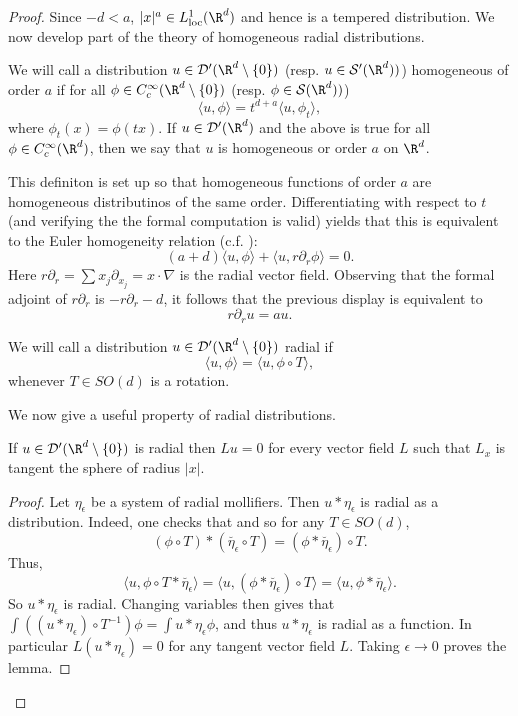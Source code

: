\documentclass[12pt]{article}
\begin{document}
\begin{proof}
Since $-d < a$, $|x|^a \in L^1_{\text{loc}}(\R^d)$ and hence is a tempered distribution. We now develop part of the theory of homogeneous radial distributions.
\begin{defn} We will call a distribution $u \in \mathcal D'(\R^d\setminus\{0\})$ (resp. $u \in \mathcal S'(\R^d))$) homogeneous of order $a$ if for all $\phi \in C_c^\infty(\R^d\setminus\{0\})$ (resp. $\phi \in \mathcal S(\R^d))$)
\[\langle u,\phi\rangle = t^{d+a}\langle u,\phi_t\rangle,\]
where $\phi_t(x) = \phi(tx)$. If $u \in \mathcal D'(\R^d)$ and the above is true for all $\phi \in C_c^\infty(\R^d)$, then we say that $u$ is homogeneous or order $a$ on $\R^d$.\end{defn} This definiton is set up so that homogeneous functions of order $a$ are homogeneous distributinos of the same order. Differentiating with respect to $t$ (and verifying the the formal computation is valid) yields that this is equivalent to the Euler homogeneity relation (c.f. \cite[\S 3.2]{Hor}):
\[(a+d)\langle u,\phi\rangle + \langle u,r\partial_r \phi\rangle = 0.\] Here $r\partial_r = \sum x_j\partial_{x_j} = x\cdot \nabla$ is the radial vector field. Observing that the formal adjoint of $r\partial_r$ is $-r\partial_r - d$, it follows that the previous display is equivalent to
\begin{equation}\label{Euler}r\partial_r u = a u.\end{equation}
\begin{defn}We will call a distribution $u \in \mathcal D'(\R^d\setminus\{0\})$ radial if
\[\langle u,\phi\rangle = \langle u, \phi\circ T\rangle,\]
whenever $T \in SO(d)$ is a rotation.\end{defn}
We now give a useful property of radial distributions.
\begin{lem}
If $u \in \mathcal D'(\R^d\setminus\{0\})$ is radial then $Lu = 0$ for every vector field $L$ such that $L_x$ is tangent the sphere of radius $|x|$.\end{lem}
\begin{proof}
Let $\eta_\epsilon$ be a system of radial mollifiers. Then $u\ast \eta_\epsilon$ is radial as a distribution. Indeed, one checks that and so for any $T \in SO(d)$,
\[(\phi \circ T)\ast (\breve{\eta_\epsilon}\circ T) = (\phi\ast \breve{\eta_\epsilon})\circ T.\] Thus,
\[\langle u,\phi\circ T\ast \breve{\eta_\epsilon}\rangle = \langle u,(\phi\ast \breve{\eta_\epsilon})\circ T\rangle = \langle u,\phi\ast \breve{\eta_\epsilon}\rangle.\]
So $u\ast\eta_\epsilon$ is radial. Changing variables then gives that $\int ((u\ast \eta_\epsilon)\circ T^{-1})\phi = \int u\ast\eta_\epsilon \phi$, and thus $u\ast \eta_\epsilon$ is radial as a function. In particular $L(u\ast \eta_\epsilon) = 0$ for any tangent vector field $L$. Taking $\epsilon \to 0$ proves the lemma.\end{proof}

\end{proof}
\end{document}
